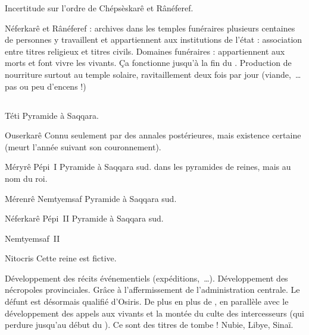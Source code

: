 Incertitude sur l'ordre de Chépsèskarê et Rânéferef.

Néferkarê et Rânéferef : archives dans les temples funéraires \donc{} 
plusieurs centaines de personnes y travaillent et appartiennent aux 
institutions de l'état : association entre titres religieux et titres 
civils. Domaines funéraires : appartiennent aux morts et font vivre 
les vivants. Ça fonctionne jusqu'à la fin du \MK.
Production de nourriture surtout au temple solaire, ravitaillement 
deux fois par jour (viande,~\dots pas ou peu d'encens !)

\subsection{\texorpdfstring{}{VIe dynastie}}

\begin{listerois}
  \item [Téti] Pyramide à Saqqara.
  \item [Ouserkarê] Connu seulement par des annales postérieures, 
        mais existence certaine (meurt l'année suivant son 
        couronnement).
  \item [Méryrê Pépi~I\ier] Pyramide à Saqqara sud.
        \TP dans les pyramides de reines, mais au nom du roi.
  \item [Mérenrê Nemtyemsaf] Pyramide à Saqqara sud.
  \item [Néferkarê Pépi~II] Pyramide à Saqqara sud.
  \item [Nemtyemsaf~II]
  \item [Nitocris] Cette reine est fictive.
\end{listerois}

Développement des récits événementiels (expéditions,~\dots).
Développement des nécropoles provinciales. Grâce à l'affermissement 
de l'administration centrale. 
Le défunt est désormais qualifié d'Osiris.
De plus en plus de , en parallèle 
avec le développement des appels aux vivants et la montée du culte des 
intercesseurs (qui perdure jusqu'au début du \NK). Ce sont des titres 
de tombe !
Nubie, Libye, Sinaï.

\section{\PPI}


